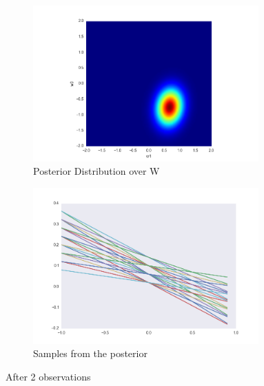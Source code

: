 \documentclass[a4paper,11pt]{article}
\theoremstyle{mytheor}
\begin{document}
\begin{figure}[h]
\begin{subfigure}{0.5\textwidth}
\includegraphics[width=\linewidth, height=6cm]{posterior-2points} 
\caption{Posterior Distribution over W}
\end{subfigure}
\begin{subfigure}{0.5\textwidth}
\includegraphics[width=\linewidth, height=6cm]{samples-2points}
\caption{Samples from the posterior}
\end{subfigure}
\caption{After 2 observations}
\label{fig:two}
\end{figure}
\end{document}
